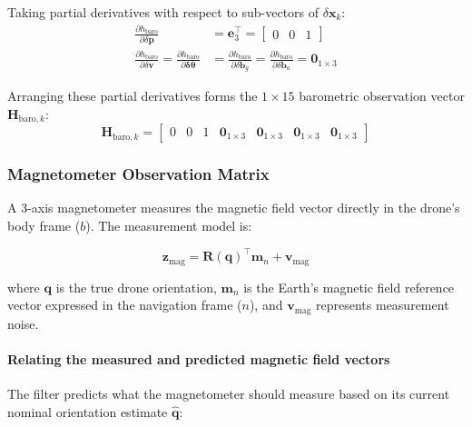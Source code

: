 \documentclass{article}
\begin{document}
	Taking partial derivatives with respect to sub-vectors of $\delta\mathbf{x}_k$:
	\begin{align*}
		\frac{\partial h_{\text{baro}}}{\partial \delta\mathbf{p}} &= \mathbf{e}_3^\top = \begin{bmatrix} 0 & 0 & 1 \end{bmatrix} \\
		\frac{\partial h_{\text{baro}}}{\partial \delta\mathbf{v}} = \frac{\partial h_{\text{baro}}}{\partial \bm{\delta\theta}} &= \frac{\partial h_{\text{baro}}}{\partial \delta\mathbf{b}_g} = \frac{\partial h_{\text{baro}}}{\partial \delta\mathbf{b}_a} = \mathbf{0}_{1 \times 3}
	\end{align*}
	
	Arranging these partial derivatives forms the $1 \times 15$ barometric observation vector $\mathbf{H}_{\text{baro}, k}$:
	\begin{equation*}
		\mathbf{H}_{\text{baro}, k} = 
		\begin{bmatrix}
			0 & 0 & 1 & \mathbf{0}_{1 \times 3} & \mathbf{0}_{1 \times 3} & \mathbf{0}_{1 \times 3} & \mathbf{0}_{1 \times 3}
		\end{bmatrix}
	\end{equation*}
	

	\subsubsection{Magnetometer Observation Matrix}
	
	A 3-axis magnetometer measures the magnetic field vector directly in the drone's body frame ($b$). The measurement model is:
	
	\begin{equation*}
		\mathbf{z}_{\text{mag}} =
		\mathbf{R}(\mathbf{q})^\top \mathbf{m}_n
		+ \mathbf{v}_{\text{mag}}
	\end{equation*}
	
	where $\mathbf{q}$ is the true drone orientation, $\mathbf{m}_n$ is the Earth's magnetic field reference vector expressed in the navigation frame ($n$), and $\mathbf{v}_{\text{mag}}$ represents measurement noise.
	
	\paragraph{Relating the measured and predicted magnetic field vectors}
	
	The filter predicts what the magnetometer should measure based on its current nominal orientation estimate $\hat{\mathbf{q}}$:
	
\end{document}

